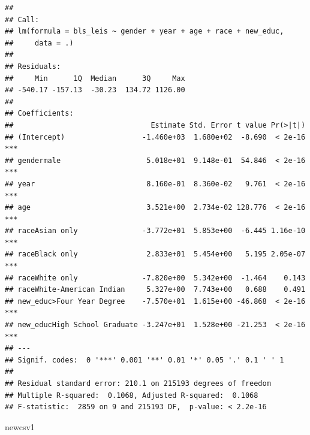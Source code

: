 \documentclass[
]{article}
\newenvironment{Shaded}{\begin{snugshade}}{\end{snugshade}}
\newcommand{\NormalTok}[1]{#1}
\begin{document}
\begin{verbatim}
## 
## Call:
## lm(formula = bls_leis ~ gender + year + age + race + new_educ, 
##     data = .)
## 
## Residuals:
##     Min      1Q  Median      3Q     Max 
## -540.17 -157.13  -30.23  134.72 1126.00 
## 
## Coefficients:
##                                Estimate Std. Error t value Pr(>|t|)    
## (Intercept)                  -1.460e+03  1.680e+02  -8.690  < 2e-16 ***
## gendermale                    5.018e+01  9.148e-01  54.846  < 2e-16 ***
## year                          8.160e-01  8.360e-02   9.761  < 2e-16 ***
## age                           3.521e+00  2.734e-02 128.776  < 2e-16 ***
## raceAsian only               -3.772e+01  5.853e+00  -6.445 1.16e-10 ***
## raceBlack only                2.833e+01  5.454e+00   5.195 2.05e-07 ***
## raceWhite only               -7.820e+00  5.342e+00  -1.464    0.143    
## raceWhite-American Indian     5.327e+00  7.743e+00   0.688    0.491    
## new_educ>Four Year Degree    -7.570e+01  1.615e+00 -46.868  < 2e-16 ***
## new_educHigh School Graduate -3.247e+01  1.528e+00 -21.253  < 2e-16 ***
## ---
## Signif. codes:  0 '***' 0.001 '**' 0.01 '*' 0.05 '.' 0.1 ' ' 1
## 
## Residual standard error: 210.1 on 215193 degrees of freedom
## Multiple R-squared:  0.1068, Adjusted R-squared:  0.1068 
## F-statistic:  2859 on 9 and 215193 DF,  p-value: < 2.2e-16
\end{verbatim}

\begin{Shaded}
\begin{Highlighting}[]
\NormalTok{newcsv1}
\end{Highlighting}
\end{Shaded}
\end{document}
